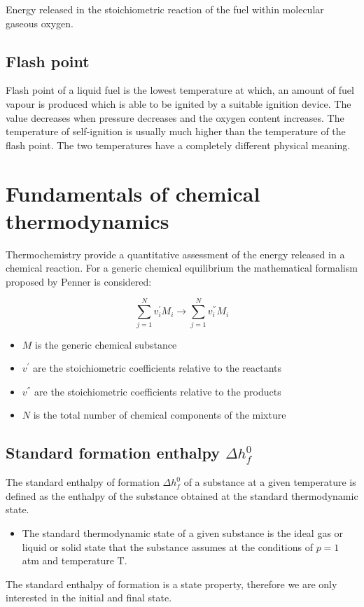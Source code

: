 \documentclass[12pt]{article}
\begin{document}
Energy released in the stoichiometric reaction of the fuel within molecular gaseous oxygen.

\subsection{Flash point}

Flash point of a liquid fuel is the lowest temperature at which, an amount of fuel vapour is produced which is able to be ignited by a suitable ignition device. The value decreases when pressure decreases and the oxygen content increases. The temperature of self-ignition is usually much higher than the temperature of the flash point. The two temperatures have a completely different physical meaning.

\newpage

\section{Fundamentals of chemical thermodynamics}

Thermochemistry provide a quantitative assessment of the energy released in a chemical reaction.
For a generic chemical equilibrium the mathematical formalism proposed by Penner is considered:

\begin{equation}
    \sum_{j=1}^{N} v_{i}^{'}M_{i} \rightarrow  \sum_{j=1}^{N} v_{i}^{''}M_{i}
\end{equation}

\begin{itemize}
    \item $M$ is the generic chemical substance
    \item $v^{'}$ are the stoichiometric coefficients relative to the reactants
    \item $v^{''}$ are the stoichiometric coefficients relative to the products
    \item $N$ is the total number of chemical components of the mixture

\end{itemize}

\subsection{Standard formation enthalpy $\Delta h_{f}^{0}$}

The standard enthalpy of formation $\Delta h_{f}^{0}$ of a substance at a given temperature is defined as the enthalpy of the substance obtained at the standard thermodynamic state.
\begin{itemize}
    \item The standard thermodynamic state of a given substance is the ideal gas or liquid or solid state that the substance assumes at the conditions of $p=1$ atm and temperature T.
\end{itemize}
The standard enthalpy of formation is a state property, therefore we are only interested in the initial and final state.
\end{document}
